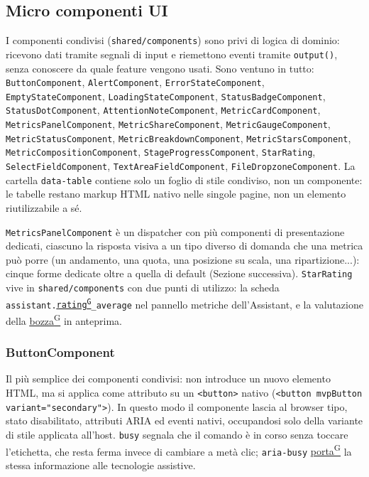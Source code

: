 \documentclass[a4paper,12pt]{article}
\providecommand{\glslink}[2]{\href{https://alittlebyte-19.github.io/Documentazione/glossario.html\#gls-#1}{\underline{#2}\textsuperscript{\scriptsize G}}}
\begin{document}
\begin{sloppypar}
\subsection{Micro componenti UI}

I componenti condivisi (\texttt{shared/components}) sono privi di logica di dominio: ricevono dati tramite segnali di input e riemettono eventi tramite \texttt{output()}, senza conoscere da quale feature vengono usati. Sono ventuno in tutto: \texttt{ButtonComponent}, \texttt{AlertComponent}, \texttt{ErrorStateComponent}, \texttt{EmptyStateComponent}, \texttt{LoadingStateComponent}, \texttt{StatusBadgeComponent}, \texttt{StatusDotComponent}, \texttt{AttentionNoteComponent}, \texttt{MetricCardComponent}, \texttt{MetricsPanelComponent}, \texttt{MetricShareComponent}, \texttt{MetricGaugeComponent}, \texttt{MetricStatusComponent}, \texttt{MetricBreakdownComponent}, \texttt{MetricStarsComponent}, \texttt{MetricCompositionComponent}, \texttt{StageProgressComponent}, \texttt{StarRating}, \texttt{SelectFieldComponent}, \texttt{TextAreaFieldComponent}, \texttt{FileDropzoneComponent}. La cartella \texttt{data-table} contiene solo un foglio di stile condiviso, non un componente: le tabelle restano markup HTML nativo nelle singole pagine, non un elemento riutilizzabile a sé.

\texttt{MetricsPanelComponent} è un dispatcher con più componenti di presentazione dedicati, ciascuno la risposta visiva a un tipo diverso di domanda che una metrica può porre (un andamento, una quota, una posizione su scala, una ripartizione...): cinque forme dedicate oltre a quella di default (Sezione successiva). \texttt{StarRating} vive in \texttt{shared/components} con due punti di utilizzo: la scheda \texttt{assistant.\glslink{rating}{rating}\_average} nel pannello metriche dell'Assistant, e la valutazione della \glslink{bozza-draft}{bozza} in anteprima.

\subsubsection{ButtonComponent}

Il più semplice dei componenti condivisi: non introduce un nuovo elemento HTML, ma si applica come attributo su un \texttt{<button>} nativo (\texttt{<button mvpButton variant="secondary">}). In questo modo il componente lascia al browser tipo, stato disabilitato, attributi ARIA ed eventi nativi, occupandosi solo della variante di stile applicata all'host. \texttt{busy} segnala che il comando è in corso senza toccare l'etichetta, che resta ferma invece di cambiare a metà clic; \texttt{aria-busy} \glslink{porta}{porta} la stessa informazione alle tecnologie assistive.


\end{sloppypar}
\end{document}

